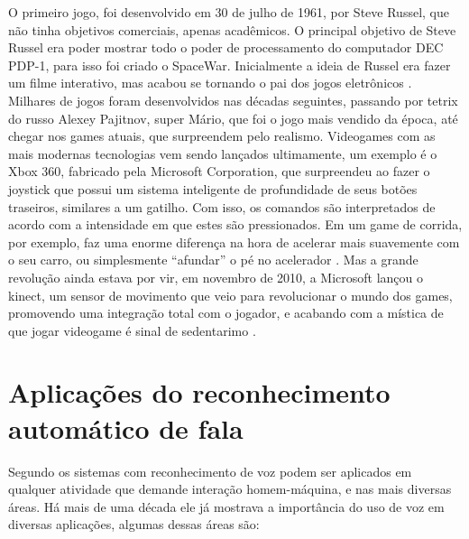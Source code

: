     O primeiro jogo, foi desenvolvido em 30 de julho de 1961, por Steve Russel, que não tinha objetivos comerciais, apenas acadêmicos. O principal objetivo de Steve Russel era poder mostrar todo o poder de processamento do computador DEC PDP-1, para isso foi criado o SpaceWar. Inicialmente a ideia de Russel era fazer um filme interativo, mas acabou se tornando o pai dos jogos eletrônicos \cite{HistJogosHenrique}. Milhares de jogos foram desenvolvidos nas décadas seguintes, passando por tetrix do russo Alexey Pajitnov, super Mário, que foi o jogo mais vendido da época, até chegar nos games atuais, que surpreendem pelo realismo. Videogames com as mais modernas tecnologias vem sendo lançados ultimamente, um exemplo é o Xbox 360, fabricado pela Microsoft Corporation, que surpreendeu ao fazer o joystick que possui um sistema inteligente de profundidade de seus botões traseiros, similares a um gatilho. Com isso, os comandos são interpretados de acordo com a intensidade em que estes são pressionados. Em um game de corrida, por exemplo, faz uma enorme diferença na hora de acelerar mais suavemente com o seu carro, ou simplesmente “afundar” o pé no acelerador \cite{XBoxTechT}. Mas a grande revolução ainda estava por vir, em novembro de 2010, a Microsoft lançou o kinect, um sensor de movimento que veio para revolucionar o mundo dos games, promovendo uma integração total com o jogador, e acabando com a mística de que jogar videogame é sinal de sedentarimo \cite{KinectTechT}.

\section{Aplicações do reconhecimento automático de fala}
Segundo  os sistemas com reconhecimento de voz podem ser aplicados em qualquer atividade que demande interação homem-máquina, e nas mais diversas áreas. Há mais de uma década ele já mostrava a importância do uso de voz em diversas aplicações, algumas dessas áreas são:

